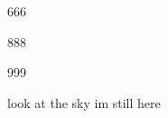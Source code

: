 \documentclass{article}
\begin{document}
666

888

999

look at the sky im still here
\end{document}

